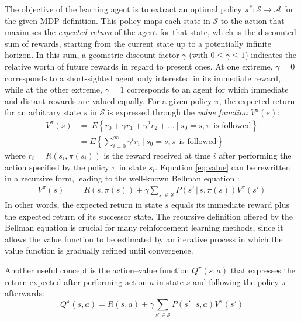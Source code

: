 The objective of the learning agent is to extract an optimal policy $\pi^*: \mathcal{S} \rightarrow \mathcal{A}$ for the given MDP definition. This policy maps each state in $\mathcal{S}$ to the action that maximises the \textit{expected return} of the agent for that state, which is the discounted sum of rewards, starting from the current state up to a potentially infinite horizon.  In this sum, a geometric discount factor $\gamma$ (with $0 \leq \gamma \leq 1$) indicates the relative worth of future rewards in regard to present ones. At one extreme, $\gamma = 0$ corresponds to a short-sighted agent only interested in its immediate reward, while at the other extreme, $\gamma=1$ corresponds to an agent for which immediate and distant rewards are valued equally. For a given policy $\pi$, the expected return for an arbitrary state $s$ in $\mathcal{S}$ is expressed through the \textit{value function} $V^{\pi}(s)$:
\begin{align}
V^{\pi}(s) & = \  E \left\{ r_0 + \gamma r_1 + \gamma^2 r_2 + \dots \ \big| \ s_0 = s, \pi \text{ is followed} \right\} \\
& = E \left\{\sum_{i=0}^{\infty}  \gamma^i r_{i} \ \bigg| \ s_0 = s, \pi \text{ is followed} \right\} \label{eq:value}
\end{align} 
where $r_i = R(s_i, \pi(s_i))$ is the reward received at time $i$ after performing the action specified by the policy $\pi$  in state $s_i$.  Equation \eqref{eq:value}  can be rewritten in a recursive form, leading to the well-known Bellman equation \citep{Bellman:1957}:
\begin{align}
V^{\pi}(s) & = \    R(s, \pi(s)) + \gamma  \sum_{s' \in \mathcal{S}} P(s'\, | \, s,\pi(s)) V^{\pi}(s') \label{eq:bellman}
\end{align} 
In other words, the expected return in state $s$ equals its immediate reward plus the expected return of its successor state.  The recursive definition offered by the Bellman equation is crucial for many reinforcement learning methods, since it allows the value function to be estimated by an iterative process in which the value function is gradually refined until convergence.

Another useful concept is the action--value function $Q^{\pi}(s,a)$ that expresses the return expected after performing action $a$ in state $s$ and following the policy $\pi$ afterwards:
\begin{equation}
Q^{\pi}(s,a) = R(s,a) + \gamma  \sum_{s' \in \mathcal{S}} P(s'\, | \, s,a) V^{\pi}(s')
\end{equation}

